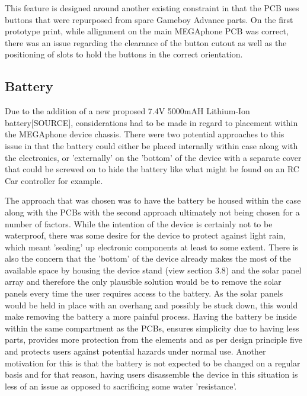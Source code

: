 This feature is designed around another existing constraint in that the PCB uses buttons that were repurposed from spare Gameboy Advance parts. %
On the first prototype print, while allignment on the main MEGAphone PCB was correct, there was an issue regarding the clearance of the button cutout as well as the positioning of slots to hold the buttons in the correct orientation.

\subsection{Battery}

Due to the addition of a new proposed 7.4V 5000mAH Lithium-Ion battery[SOURCE], considerations had to be made in regard to placement within the MEGAphone device chassis.
There were two potential approaches to this issue in that the battery could either be placed internally within case along with the electronics, or 'externally' on the 'bottom' of the device with a separate cover that could be screwed on to hide the battery like what might be found on an RC Car controller for example.

The approach that was chosen was to have the battery be housed within the case along with the PCBs with the second approach ultimately not being chosen for a number of factors.
While the intention of the device is certainly not to be waterproof, there was some desire for the device to protect against light rain, which meant 'sealing' up electronic components at least to some extent.
There is also the concern that the 'bottom' of the device already makes the most of the available space by housing the device stand (view section 3.8) and the solar panel array and therefore the only plausible solution would be to remove the solar panels every time the user requires access to the battery.
As the solar panels would be held in place with an overhang and possibly be stuck down, this would make removing the battery a more painful process.
Having the battery be inside within the same compartment as the PCBs, ensures simplicity due to having less parts, provides more protection from the elements and as per design principle five and protects users against potential hazards under normal use.
Another motivation for this is that the battery is not expected to be changed on a regular basis and for that reason, having users disassemble the device in this situation is less of an issue as opposed to sacrificing some water 'resistance'.

